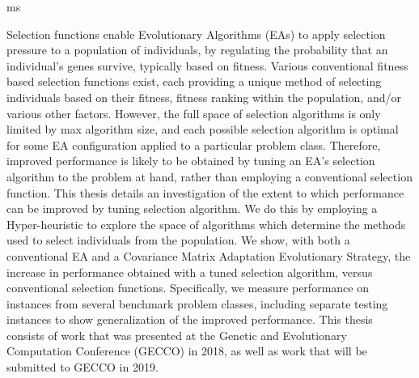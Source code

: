 \documentclass[times,12pt,titlepage]{mstogs}
\begin{document}

\begin{ThesisTitlePage}{ms}


\author{\MakeUppercase{Samuel Nathan Richter}}







\end{ThesisTitlePage}



\begin{ThesisAbstract}
Selection functions enable Evolutionary Algorithms (EAs) to apply selection pressure to a population of individuals, by regulating the probability that an individual's genes survive, typically based on fitness. Various conventional fitness based selection functions exist, each providing a unique method of selecting individuals based on their fitness, fitness ranking within the population, and/or various other factors. However, the full space of selection algorithms is only limited by max algorithm size, and each possible selection algorithm is optimal for some EA configuration applied to a particular problem class. Therefore, improved performance is likely to be obtained by tuning an EA's selection algorithm to the problem at hand, rather than employing a conventional selection function. This thesis details an investigation of the extent to which performance can be improved by tuning selection algorithm. We do this by employing a Hyper-heuristic to explore the space of algorithms which determine the methods used to select individuals from the population. We show, with both a conventional EA and a Covariance Matrix Adaptation Evolutionary Strategy, the increase in performance obtained with a tuned selection algorithm, versus conventional selection functions. Specifically, we measure performance on instances from several benchmark problem classes, including separate testing instances to show generalization of the improved performance. This thesis consists of work that was presented at the Genetic and Evolutionary Computation Conference (GECCO) in 2018, as well as work that will be submitted to GECCO in 2019. 
\end{ThesisAbstract}
\end{document}
